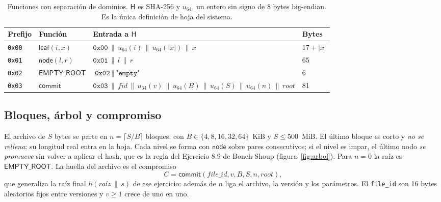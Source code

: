 \documentclass[11pt,a4paper]{article}
\newcommand{\code}[1]{\texttt{#1}}
\newcommand{\Hash}{\mathsf{H}}
\begin{document}
\begin{table}[ht]
\centering\small
\begin{tabular}{@{}llll@{}}
\toprule
Prefijo & Función & Entrada a $\Hash$ & Bytes \\
\midrule
\code{0x00} & $\mathsf{leaf}(i,x)$ & $\code{0x00}\,\|\,u_{64}(i)\,\|\,u_{64}(|x|)\,\|\,x$ & $17+|x|$ \\
\code{0x01} & $\mathsf{node}(l,r)$ & $\code{0x01}\,\|\,l\,\|\,r$ & 65 \\
\code{0x02} & $\mathsf{EMPTY\_ROOT}$ & $\code{0x02}\,\|\,\texttt{"empty"}$ & 6 \\
\code{0x03} & $\mathsf{commit}$ & $\code{0x03}\,\|\,\mathit{fid}\,\|\,u_{64}(v)\,\|\,u_{64}(B)\,\|\,u_{64}(S)\,\|\,u_{64}(n)\,\|\,\mathit{root}$ & 81 \\
\bottomrule
\end{tabular}
\caption{Funciones con separación de dominios. $\Hash$ es SHA-256 y $u_{64}$, un entero sin signo de
8 bytes big-endian. Es la única definición de hoja del sistema.}
\label{tab:dominios}
\end{table}

\subsection{Bloques, árbol y compromiso}
El archivo de $S$ bytes se parte en $n=\lceil S/B\rceil$ bloques, con $B\in\{4,8,16,32,64\}$~KiB y
$S\le 500$~MiB. El último bloque es corto y \emph{no se rellena}: su longitud real entra en la hoja.
Cada nivel se forma con $\mathsf{node}$ sobre pares consecutivos; si el nivel es impar, el último
nodo \emph{se promueve} sin volver a aplicar el hash, que es la regla del Ejercicio 8.9 de
Boneh-Shoup (figura~\ref{fig:arbol}). Para $n=0$ la raíz es $\mathsf{EMPTY\_ROOT}$. La huella del
archivo es el compromiso
\[
C=\mathsf{commit}(\mathit{file\_id}, v, B, S, n, \mathit{root}),
\]
que generaliza la raíz final $h(\textit{raíz}\,\|\,s)$ de ese ejercicio: además de $n$ liga el
archivo, la versión y los parámetros. El \code{file\_id} son 16 bytes aleatorios fijos entre
versiones y $v\ge 1$ crece de uno en uno.
\end{document}
